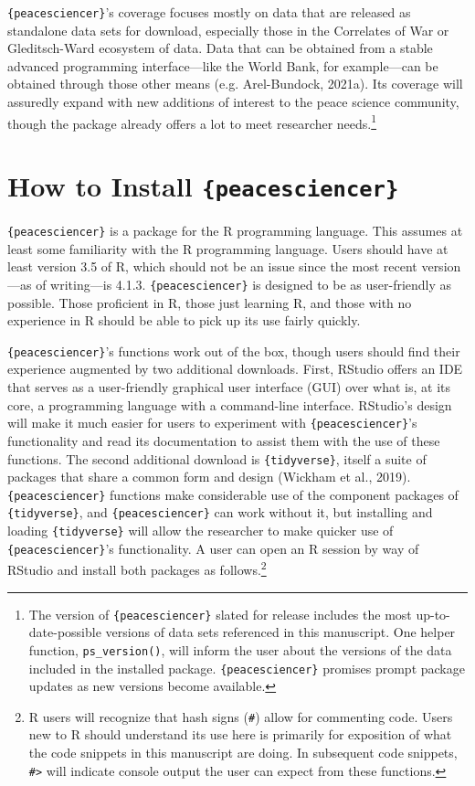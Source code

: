 \documentclass[
  11pt,
]{article}
\begin{document}
\texttt{\{peacesciencer\}}'s coverage focuses mostly on data that are released as standalone data sets for download, especially those in the Correlates of War or Gleditsch-Ward ecosystem of data. Data that can be obtained from a stable advanced programming interface---like the World Bank, for example---can be obtained through those other means (e.g. Arel-Bundock, 2021a). Its coverage will assuredly expand with new additions of interest to the peace science community, though the package already offers a lot to meet researcher needs.\footnote{The version of \texttt{\{peacesciencer\}} slated for release includes the most up-to-date-possible versions of data sets referenced in this manuscript. One helper function, \texttt{ps\_version()}, will inform the user about the versions of the data included in the installed package. \texttt{\{peacesciencer\}} promises prompt package updates as new versions become available.}

\hypertarget{how-to-install-peacesciencer}{%
\section{\texorpdfstring{How to Install \texttt{\{peacesciencer\}}}{How to Install \{peacesciencer\}}}\label{how-to-install-peacesciencer}}

\texttt{\{peacesciencer\}} is a package for the R programming language. This assumes at least some familiarity with the R programming language. Users should have at least version 3.5 of R, which should not be an issue since the most recent version---as of writing---is 4.1.3. \texttt{\{peacesciencer\}} is designed to be as user-friendly as possible. Those proficient in R, those just learning R, and those with no experience in R should be able to pick up its use fairly quickly.

\texttt{\{peacesciencer\}}'s functions work out of the box, though users should find their experience augmented by two additional downloads. First, RStudio offers an IDE that serves as a user-friendly graphical user interface (GUI) over what is, at its core, a programming language with a command-line interface. RStudio's design will make it much easier for users to experiment with \texttt{\{peacesciencer\}}'s functionality and read its documentation to assist them with the use of these functions. The second additional download is \texttt{\{tidyverse\}}, itself a suite of packages that share a common form and design (Wickham et al., 2019). \texttt{\{peacesciencer\}} functions make considerable use of the component packages of \texttt{\{tidyverse\}}, and \texttt{\{peacesciencer\}} can work without it, but installing and loading \texttt{\{tidyverse\}} will allow the researcher to make quicker use of \texttt{\{peacesciencer\}}'s functionality. A user can open an R session by way of RStudio and install both packages as follows.\footnote{R users will recognize that hash signs (\texttt{\#}) allow for commenting code. Users new to R should understand its use here is primarily for exposition of what the code snippets in this manuscript are doing. In subsequent code snippets, \texttt{\#\textgreater{}} will indicate console output the user can expect from these functions.}
\end{document}
